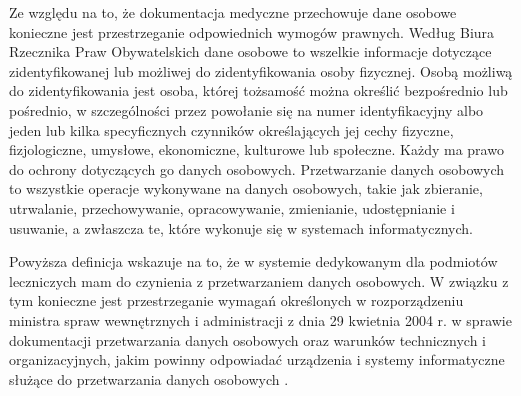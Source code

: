 Ze względu na to, że dokumentacja medyczne przechowuje dane osobowe konieczne jest przestrzeganie odpowiednich wymogów prawnych.
Według Biura Rzecznika Praw Obywatelskich \cite{mz:do:online} dane osobowe to wszelkie informacje dotyczące zidentyfikowanej lub możliwej do zidentyfikowania osoby fizycznej. Osobą możliwą do zidentyfikowania jest osoba, której tożsamość można określić bezpośrednio lub pośrednio, w szczególności przez powołanie się na numer identyfikacyjny albo jeden lub kilka specyficznych czynników określających jej cechy fizyczne, fizjologiczne, umysłowe, ekonomiczne, kulturowe lub społeczne. Każdy ma prawo do ochrony dotyczących go danych osobowych. Przetwarzanie danych osobowych to wszystkie operacje wykonywane na danych osobowych, takie jak zbieranie, utrwalanie, przechowywanie, opracowywanie, zmienianie, udostępnianie i usuwanie, a zwłaszcza te, które wykonuje się w systemach informatycznych.

Powyższa definicja wskazuje na to, że w systemie dedykowanym dla podmiotów leczniczych mam do czynienia z przetwarzaniem danych osobowych. W związku z tym konieczne jest przestrzeganie wymagań określonych w rozporządzeniu ministra spraw wewnętrznych i administracji z dnia 29 kwietnia 2004 r. w sprawie dokumentacji przetwarzania danych osobowych oraz warunków technicznych i organizacyjnych, jakim powinny odpowiadać urządzenia i systemy informatyczne służące do przetwarzania danych osobowych \cite{mz:odo:online}. 

